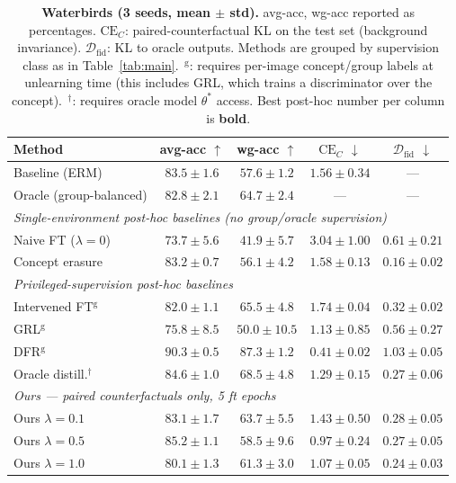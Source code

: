 \documentclass{article}
\newcommand{\CE}{\mathrm{CE}}
\newcommand{\Dfid}{\mathcal{D}_{\mathrm{fid}}}
\begin{document}
\begin{table}[t]
\centering
\caption{%
  \textbf{Waterbirds (3 seeds, mean $\pm$ std).}
  avg-acc, wg-acc reported as percentages.
  $\CE_C$: paired-counterfactual KL on the test set (background invariance).
  $\Dfid$: KL to oracle outputs.
  Methods are grouped by supervision class as in Table~\ref{tab:main}.
  $^{\,\mathrm{g}}$: requires per-image concept/group labels at unlearning
  time (this includes GRL, which trains a discriminator over the concept).
  $^{\,\dagger}$: requires oracle model $\theta^*$ access.
  Best post-hoc number per column is \textbf{bold}.
}
\label{tab:waterbirds}
\smallskip
\small
\setlength{\tabcolsep}{4.5pt}
\begin{tabular}{lcccc}
\toprule
\textbf{Method} & avg-acc $\uparrow$ & wg-acc $\uparrow$ & $\CE_C$ $\downarrow$ & $\Dfid$ $\downarrow$ \\
\midrule
Baseline (ERM)                          & $83.5 \pm 1.6$ & $57.6 \pm 1.2$ & $1.56 \pm 0.34$ & --- \\
Oracle (group-balanced)                 & $82.8 \pm 2.1$ & $64.7 \pm 2.4$ & --- & --- \\
\midrule
\multicolumn{5}{l}{\textit{Single-environment post-hoc baselines (no group/oracle supervision)}} \\
Naive FT ($\lambda{=}0$)                & $73.7 \pm 5.6$ & $41.9 \pm 5.7$ & $3.04 \pm 1.00$ & $0.61 \pm 0.21$ \\
Concept erasure                         & $83.2 \pm 0.7$ & $56.1 \pm 4.2$ & $1.58 \pm 0.13$ & $\mathbf{0.16 \pm 0.02}$ \\
\midrule
\multicolumn{5}{l}{\textit{Privileged-supervision post-hoc baselines}} \\
Intervened FT$^{\mathrm{g}}$            & $82.0 \pm 1.1$ & $65.5 \pm 4.8$ & $1.74 \pm 0.04$ & $0.32 \pm 0.02$ \\
GRL$^{\mathrm{g}}$                      & $75.8 \pm 8.5$ & $50.0 \pm 10.5$ & $1.13 \pm 0.85$ & $0.56 \pm 0.27$ \\
DFR$^{\mathrm{g}}$~\cite{kirichenko2023last} & $\mathbf{90.3 \pm 0.5}$ & $\mathbf{87.3 \pm 1.2}$ & $\mathbf{0.41 \pm 0.02}$ & $1.03 \pm 0.05$ \\
Oracle distill.$^{\dagger}$             & $\mathbf{84.6 \pm 1.0}$ & $\mathbf{68.5 \pm 4.8}$ & $1.29 \pm 0.15$ & $0.27 \pm 0.06$ \\
\midrule
\multicolumn{5}{l}{\textit{Ours --- paired counterfactuals only, 5 ft epochs}} \\
Ours $\lambda{=}0.1$                    & $83.1 \pm 1.7$ & $63.7 \pm 5.5$ & $1.43 \pm 0.50$ & $0.28 \pm 0.05$ \\
Ours $\lambda{=}0.5$                    & $85.2 \pm 1.1$ & $58.5 \pm 9.6$ & $\mathbf{0.97 \pm 0.24}$ & $0.27 \pm 0.05$ \\
Ours $\lambda{=}1.0$                    & $80.1 \pm 1.3$ & $61.3 \pm 3.0$ & $1.07 \pm 0.05$ & $0.24 \pm 0.03$ \\
\bottomrule
\end{tabular}
\end{table}
\end{document}
